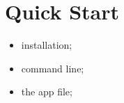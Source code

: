 \section{Quick Start}
\begin{itemize}
\item installation;
\item command line;
\item the app file;
\end{itemize}

